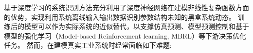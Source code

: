 


基于深度学习的系统识别方法充分利用了深度神经网络在建模非线性复杂函数方面的优势，实现利用系统离线输入输出数据识别参数结构未知的黑盒系统动态。
训练后的模型可以作为实际系统的近似替代，以支撑仿真预测、模型预测控制和基于模型的强化学习（Model-based Reinforcement learning, MBRL）等下游决策优化任务。
然而，在建模真实工业系统时经常面临如下难题:

